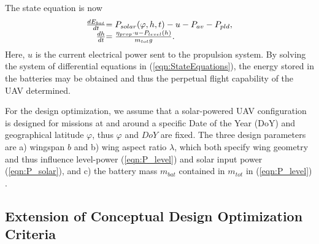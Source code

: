 The state equation is now
\begin{equation}\label{eqn:StateEquations}
\begin{array}{r@{}l}
\frac{dE_{bat}}{dt}&=P_{solar}(\varphi,h,t)-u-P_{av}-P_{pld},\\
\frac{dh}{dt}&=\frac{\eta_{prop}\cdot u-P_{level}(h)}{m_{tot}g} .
\end{array}
\end{equation}
Here, $u$ is the current electrical power sent to the propulsion system. By solving the system of differential equations in (\ref{eqn:StateEquations}), the energy stored in the batteries may be obtained and thus the perpetual flight capability of the UAV determined.

For the design optimization, we assume that a solar-powered UAV configuration is designed for missions at and around a specific Date of the Year (DoY) and geographical latitude $\varphi$, thus $\varphi$ and $DoY$ are fixed. The three design parameters are a) wingspan $b$ and b) wing aspect ratio $\lambda$, which both specify wing geometry and thus influence level-power (\ref{eqn:P_level}) and solar input power (\ref{eqn:P_solar}), and c) the battery mass $m_{bat}$ contained in $m_{tot}$ in (\ref{eqn:P_level}) .

\subsection{Extension of Conceptual Design Optimization Criteria}

